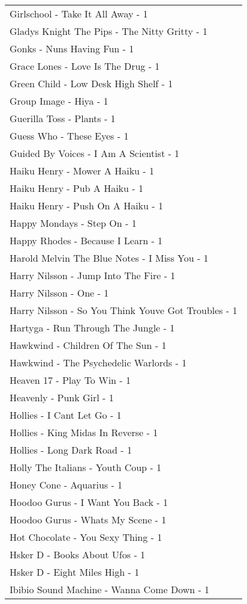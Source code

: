 \documentclass[
]{article}
\begin{document}
\begin{longtable}{l}
Girlschool - Take It All Away - 1 \\ 
Gladys Knight The Pips - The Nitty Gritty - 1 \\ 
Gonks - Nuns Having Fun - 1 \\ 
Grace Lones - Love Is The Drug - 1 \\ 
Green Child - Low Desk High Shelf - 1 \\ 
Group Image - Hiya - 1 \\ 
Guerilla Toss - Plants - 1 \\ 
Guess Who - These Eyes - 1 \\ 
Guided By Voices - I Am A Scientist - 1 \\ 
Haiku Henry - Mower A Haiku - 1 \\ 
Haiku Henry - Pub A Haiku - 1 \\ 
Haiku Henry - Push On A Haiku - 1 \\ 
Happy Mondays - Step On - 1 \\ 
Happy Rhodes - Because I Learn - 1 \\ 
Harold Melvin The Blue Notes - I Miss You - 1 \\ 
Harry Nilsson - Jump Into The Fire - 1 \\ 
Harry Nilsson - One - 1 \\ 
Harry Nilsson - So You Think Youve Got Troubles - 1 \\ 
Hartyga - Run Through The Jungle - 1 \\ 
Hawkwind - Children Of The Sun - 1 \\ 
Hawkwind - The Psychedelic Warlords - 1 \\ 
Heaven 17 - Play To Win - 1 \\ 
Heavenly - Punk Girl - 1 \\ 
Hollies - I Cant Let Go - 1 \\ 
Hollies - King Midas In Reverse - 1 \\ 
Hollies - Long Dark Road - 1 \\ 
Holly The Italians - Youth Coup - 1 \\ 
Honey Cone - Aquarius - 1 \\ 
Hoodoo Gurus - I Want You Back - 1 \\ 
Hoodoo Gurus - Whats My Scene - 1 \\ 
Hot Chocolate - You Sexy Thing - 1 \\ 
Hsker D - Books About Ufos - 1 \\ 
Hsker D - Eight Miles High - 1 \\ 
Ibibio Sound Machine - Wanna Come Down - 1 \\ 

\end{longtable}
\end{document}
